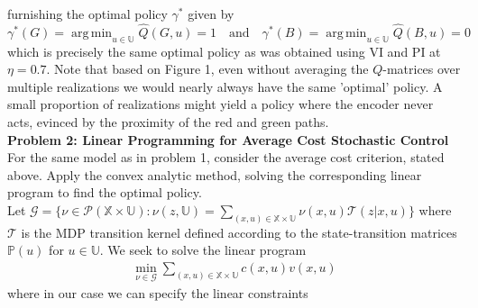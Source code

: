 \documentclass[10pt]{article}
\newcommand{\mbb}[1]{\mathbb{#1}}
\newcommand{\1}[1]{\mathbbm{1}_{#1}}
\newcommand{\mc}[1]{\mathcal{#1}}
\DeclareMathOperator{\argmin}{arg\,min}
\begin{document}
    furnishing the optimal policy $\gamma^\ast$ given by
    \[\gamma^\ast(G)=\argmin_{u\in\mbb{U}}\hat{Q}(G, u)=1\quad\text{and}\quad\gamma^\ast(B)=\argmin_{u\in\mbb{U}}\hat{Q}(B, u)=0\]
    which is precisely the same optimal policy as was obtained using VI and PI at $\eta=0.7$. Note that based on Figure 1, even without averaging the $Q$-matrices
    over multiple realizations we would nearly always have the same 'optimal' policy. A small proportion of realizations might yield a policy where the encoder never acts,
    evinced by the proximity of the red and green paths.\\[5pt]
    {\bf Problem 2: Linear Programming for Average Cost Stochastic Control}\\[5pt]
    For the same model as in problem 1, consider the average cost criterion, stated above. Apply the convex analytic method, solving the corresponding linear program to find the optimal policy.\\[5pt]
    Let $\mc{G}=\{\nu\in\mc{P}(\mbb{X}\times\mbb{U}):\nu(z,\mbb{U})=\sum_{(x,u)\in\mbb{X}\times\mbb{U}}\nu(x,u)\mc{T}(z|x,u)\}$ where $\mc{T}$ is the MDP transition kernel defined according to the state-transition matrices $\mbb{P}(u)$ for $u\in\mbb{U}$. We seek to solve the linear program
    \begin{align*}
        \min_{\nu\in\mc{G}}\sum_{(x,u)\in\mbb{X}\times\mbb{U}}c(x,u)v(x,u)
    \end{align*}
    where in our case we can specify the linear constraints
\end{document}
